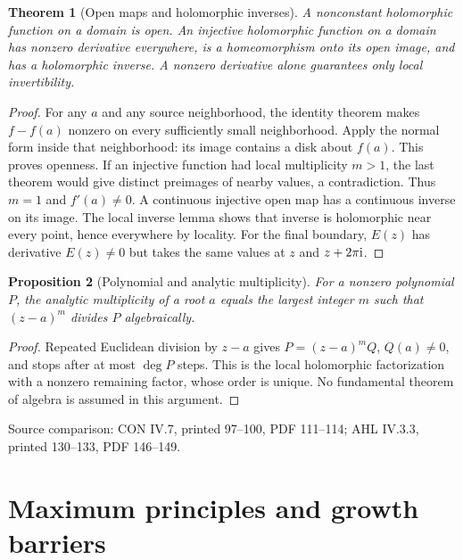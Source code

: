 \documentclass[11pt,a4paper,openany]{book}
\newtheorem{theorem}{Theorem}[chapter]
\newtheorem{proposition}[theorem]{Proposition}
\theoremstyle{definition}
\theoremstyle{remark}\newtheorem{remark}[theorem]{Remark}
\newcommand{\family}[1]{}
\newcommand{\source}[1]{\par\begingroup\small\sffamily\color{black!65}Source comparison: #1\par\endgroup}
\begin{document}
\begin{theorem}[Open maps and holomorphic inverses]\family{D12.05.06}\label{d12:05-06}
A nonconstant holomorphic function on a domain is open.
An injective holomorphic function on a domain has nonzero derivative
everywhere, is a homeomorphism onto its open image, and has a
holomorphic inverse. A nonzero derivative alone guarantees only local
invertibility.
\end{theorem}
\begin{proof}
For any \(a\) and any source neighborhood, the identity theorem makes
\(f-f(a)\) nonzero on every sufficiently small neighborhood.
Apply the normal form inside that neighborhood: its image contains a
disk about \(f(a)\). This proves openness.
If an injective function had local multiplicity \(m>1\), the last
theorem would give distinct preimages of nearby values, a contradiction.
Thus \(m=1\) and \(f'(a)\ne0\). A continuous injective open map has a
continuous inverse on its image. The local inverse lemma shows that
inverse is holomorphic near every point, hence everywhere by locality.
For the final boundary, \(E(z)\) has derivative \(E(z)\ne0\) but takes
the same values at \(z\) and \(z+2\pi\mathrm i\).
\end{proof}

\begin{proposition}[Polynomial and analytic multiplicity]\family{D12.05.07}\label{d12:05-07}
For a nonzero polynomial \(P\), the analytic multiplicity of a root
\(a\) equals the largest integer \(m\) such that \((z-a)^m\) divides
\(P\) algebraically.
\end{proposition}
\begin{proof}
Repeated Euclidean division by \(z-a\) gives
\(P=(z-a)^mQ\), \(Q(a)\ne0\), and stops after at most \(\deg P\) steps.
This is the local holomorphic factorization with a nonzero remaining
factor, whose order is unique. No fundamental theorem of algebra is
assumed in this argument.
\end{proof}
\source{CON IV.7, printed 97--100, PDF 111--114; AHL IV.3.3, printed 130--133, PDF 146--149.}



\chapter{Maximum principles and growth barriers}\label{ch:d12-06}
\end{document}
